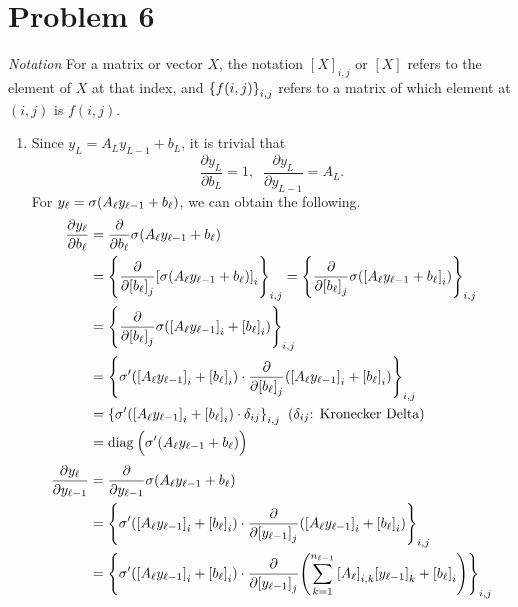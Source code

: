 \documentclass[10pt]{article}
\begin{document}
\section*{Problem 6}
\textit{Notation} For a matrix or vector $X$, the notation $[X]_{i, j}$ or $[X]$ refers to the element of $X$ at that index, and $\qty{f(i, j)}_{i, j}$ refers to a matrix of which element at $(i, j)$ is $f(i, j)$.
\begin{enumerate}[leftmargin=*, label=(\alph*)]
    \item Since $y_L = A_Ly_{L-1} + b_L$, it is trivial that 
    $$\frac{\partial y_L}{\partial b_L} = 1, \;\; \frac{\partial y_L}{\partial y_{L-1}} = A_L.$$
    For $y_\ell = \sigma\qty(A_\ell y_{\ell-1} + b_\ell)$, we can obtain the following.
    \begin{align*}
        \frac{\partial y_\ell}{\partial b_\ell} &= \frac{\partial}{\partial b_\ell}\sigma\qty(A_\ell y_{\ell-1} + b_\ell)\\
        &= \qty{\frac{\partial}{\partial\qty[b_\ell]_j}\qty[\sigma\qty(A_\ell y_{\ell-1} + b_\ell)]_i}_{i, j} = \qty{\frac{\partial}{\partial\qty[b_\ell]_j}\sigma\qty(\qty[A_\ell y_{\ell-1} + b_\ell]_i)}_{i, j} \\
        &= \qty{\frac{\partial}{\partial\qty[b_\ell]_j}\sigma\qty(\qty[A_\ell y_{\ell-1}]_i + \qty[b_\ell]_i)}_{i, j} \\
        &= \qty{\sigma'\qty(\qty[A_\ell y_{\ell-1}]_i + \qty[b_\ell]_i)\cdot\frac{\partial}{\partial\qty[b_\ell]_j}\qty(\qty[A_\ell y_{\ell-1}]_i + \qty[b_\ell]_i)}_{i, j} \\
        &= \qty{\sigma'\qty(\qty[A_\ell y_{\ell-1}]_i + \qty[b_\ell]_i)\cdot\delta_{ij}}_{i, j} \;\; (\delta_{ij} \text{: Kronecker Delta})\\
        &= \text{diag}\:\Big(\sigma'\qty(A_\ell y_{\ell-1} + b_\ell)\Big)
    \end{align*}
    \begin{align*}
        \frac{\partial y_\ell}{\partial y_{\ell-1}} &= \frac{\partial}{\partial y_{\ell-1}}\sigma\qty(A_\ell y_{\ell-1} + b_\ell) \\
        &= \qty{\sigma'\qty(\qty[A_\ell y_{\ell-1}]_i + \qty[b_\ell]_i)\cdot\frac{\partial}{\partial\qty[y_{\ell-1}]_j}\qty(\qty[A_\ell y_{\ell-1}]_i + \qty[b_\ell]_i)}_{i, j} \\
        &= \qty{\sigma'\qty(\qty[A_\ell y_{\ell-1}]_i + \qty[b_\ell]_i)\cdot\frac{\partial}{\partial\qty[y_{\ell-1}]_j}\qty(\sum_{k=1}^{n_{\ell-1}}\qty[A_\ell]_{i,k}\qty[y_{\ell-1}]_k + \qty[b_\ell]_i)}_{i, j} \\

\end{align*}
\end{enumerate}
\end{document}
